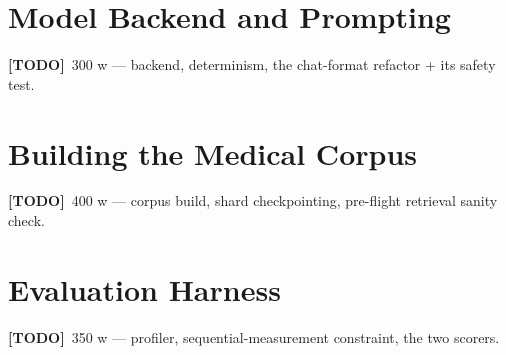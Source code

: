 \documentclass[11pt,a4paper]{report}
\newcommand{\todo}[1]{\par\noindent\textcolor{red!70!black}{\small\textbf{[TODO]}~#1}\par}
\begin{document}
\section{Model Backend and Prompting}
\label{sec:impl-backend}
\todo{300 w — backend, determinism, the chat-format refactor + its safety test.}

\section{Building the Medical Corpus}
\label{sec:impl-corpus}
\todo{400 w — corpus build, shard checkpointing, pre-flight retrieval sanity check.}

\section{Evaluation Harness}
\label{sec:impl-harness}
\todo{350 w — profiler, sequential-measurement constraint, the two scorers.}
\end{document}
